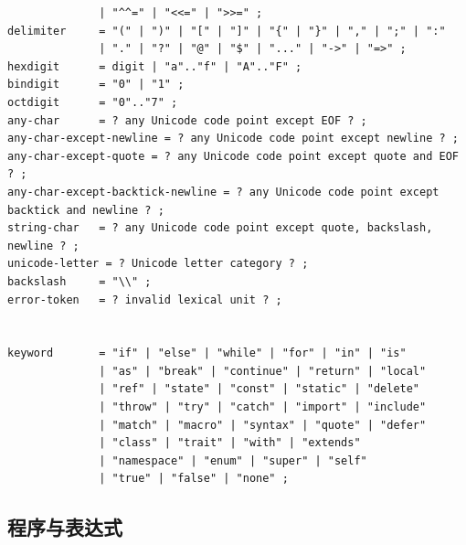 \documentclass[UTF8,12pt]{ctexart}
\begin{document}
\begin{lstlisting}
              | "^^=" | "<<=" | ">>=" ;
delimiter     = "(" | ")" | "[" | "]" | "{" | "}" | "," | ";" | ":"
              | "." | "?" | "@" | "$" | "..." | "->" | "=>" ;
hexdigit      = digit | "a".."f" | "A".."F" ;
bindigit      = "0" | "1" ;
octdigit      = "0".."7" ;
any-char      = ? any Unicode code point except EOF ? ;
any-char-except-newline = ? any Unicode code point except newline ? ;
any-char-except-quote = ? any Unicode code point except quote and EOF ? ;
any-char-except-backtick-newline = ? any Unicode code point except backtick and newline ? ;
string-char   = ? any Unicode code point except quote, backslash, newline ? ;
unicode-letter = ? Unicode letter category ? ;
backslash     = "\\" ;
error-token   = ? invalid lexical unit ? ;


keyword       = "if" | "else" | "while" | "for" | "in" | "is"
              | "as" | "break" | "continue" | "return" | "local"
              | "ref" | "state" | "const" | "static" | "delete"
              | "throw" | "try" | "catch" | "import" | "include"
              | "match" | "macro" | "syntax" | "quote" | "defer"
              | "class" | "trait" | "with" | "extends"
              | "namespace" | "enum" | "super" | "self"
              | "true" | "false" | "none" ;
\end{lstlisting}

\subsection{程序与表达式}
\end{document}
